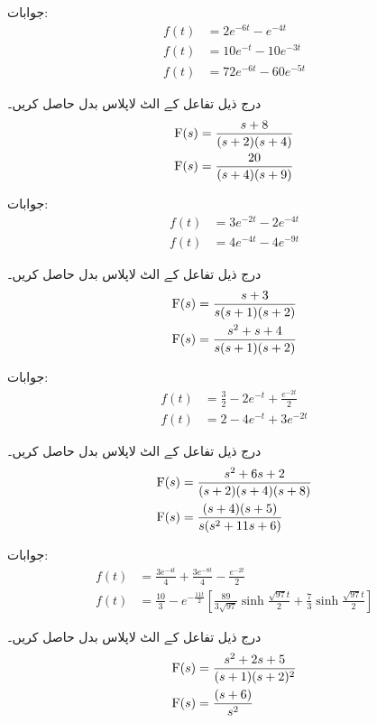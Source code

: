 جوابات:
\begin{align*}
f(t)&=2e^{-6t}-e^{-4t}\\
f(t)&=10e^{-t}-10e^{-3t}\\
f(t)&=72e^{-6t}-60e^{-5t}
\end{align*}


درج ذیل تفاعل کے الٹ لاپلاس بدل حاصل کریں۔
\begin{align*}
{\ensuremath{{\textup{F}}}}(s)&=\frac{s+8}{(s+2)(s+4)}\\
{{\textup{F}}}(s)&=\frac{20}{(s+4)(s+9)}
\end{align*}

جوابات:
\begin{align*}
f(t)&=3e^{-2t}-2e^{-4t}\\
f(t)&=4e^{-4t}-4e^{-9t}
\end{align*}

درج ذیل تفاعل کے الٹ لاپلاس بدل حاصل کریں۔
\begin{align*}
{\ensuremath{{\textup{F}}}}(s)&=\frac{s+3}{s(s+1)(s+2)}\\
{{\textup{F}}}(s)&=\frac{s^2+s+4}{s(s+1)(s+2)}
\end{align*}

جوابات:
\begin{align*}
f(t)&=\frac{3}{2}-2e^{-t}+\frac{e^{-2t}}{2}\\
f(t)&=2-4e^{-t}+3e^{-2t}
\end{align*}

درج ذیل تفاعل کے الٹ لاپلاس بدل حاصل کریں۔
\begin{align*}
{\ensuremath{{\textup{F}}}}(s)&=\frac{s^2+6s+2}{(s+2)(s+4)(s+8)}\\
{{\textup{F}}}(s)&=\frac{(s+4)(s+5)}{s(s^2+11s+6)}
\end{align*}

جوابات:
\begin{align*}
f(t)&=\frac{3e^{-4t}}{4}+\frac{3e^{-8t}}{4}-\frac{e^{-2t}}{2}\\
f(t)&=\frac{10}{3}-e^{-\frac{11t}{2}}\left[\frac{89}{3\sqrt{97}}\sinh \frac{\sqrt{97}t}{2}+\frac{7}{3}\sinh \frac{\sqrt{97}t}{2}\right]
\end{align*}

درج ذیل تفاعل کے الٹ لاپلاس بدل حاصل کریں۔
\begin{align*}
{\ensuremath{{\textup{F}}}}(s)&=\frac{s^2+2s+5}{(s+1)(s+2)^2}\\
{{\textup{F}}}(s)&=\frac{(s+6)}{s^2}
\end{align*}

